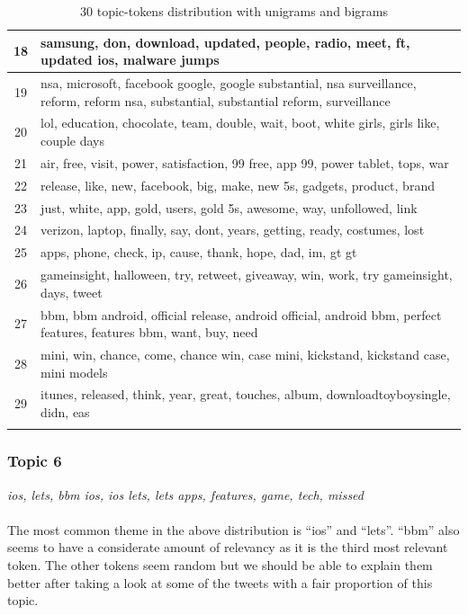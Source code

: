 \begin{longtable}{c p{16cm}}
   18   & samsung, don, download, updated, people, radio, meet, ft, updated ios, malware jumps \\ \midrule
   19   & nsa, microsoft, facebook google, google substantial, nsa surveillance, reform, reform nsa, substantial, substantial reform, surveillance \\ \midrule
   20   & lol, education, chocolate, team, double, wait, boot, white girls, girls like, couple days \\ \midrule
   21   & air, free, visit, power, satisfaction, 99 free, app 99, power tablet, tops, war \\ \midrule
   22   & release, like, new, facebook, big, make, new 5s, gadgets, product, brand \\ \midrule
   23   & just, white, app, gold, users, gold 5s, awesome, way, unfollowed, link \\ \midrule
   24   & verizon, laptop, finally, say, dont, years, getting, ready, costumes, lost \\ \midrule
   25   & apps, phone, check, ip, cause, thank, hope, dad, im, gt gt \\ \midrule
   26   & gameinsight, halloween, try, retweet, giveaway, win, work, try gameinsight, days, tweet \\ \midrule
   27   & bbm, bbm android, official release, android official, android bbm, perfect features, features bbm, want, buy, need \\ \midrule
   28   & mini, win, chance, come, chance win, case mini, kickstand, kickstand case, mini models \\ \midrule
   29   & itunes, released, think, year, great, touches, album, downloadtoyboysingle, didn, eas \\ \bottomrule
\caption{30 topic-tokens distribution with unigrams and bigrams}
\label{tab:30-topics}
\end{longtable}



\newpage
\subsubsection{Topic 6}
\label{sec:topic-6}
\textit{ios, lets, bbm ios, ios lets, lets apps, features, game, tech, missed} \\\\
The most common theme in the above distribution is ``ios'' and ``lets''. ``bbm'' also seems to have
a considerate amount of relevancy as it is the third most relevant token. The other tokens seem
random but we should be able to explain them better after taking a look at some of the tweets with a
fair proportion of this topic.


